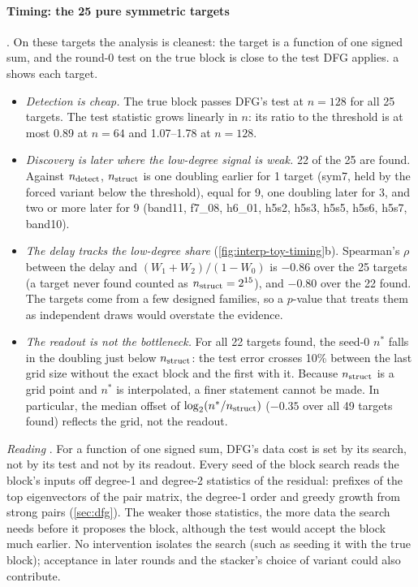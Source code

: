 \paragraph{Timing: the 25 pure symmetric targets} . On these targets the analysis is cleanest: the target is a function of one signed sum, and the round-0 test on the true block is close to the test DFG applies. a shows each target.
\begin{itemize}
\item \emph{Detection is cheap.} The true block passes DFG's test at $n=128$ for all 25 targets. The test statistic grows linearly in $n$: its ratio to the threshold is at most 0.89 at $n=64$ and 1.07--1.78 at $n=128$.
\item \emph{Discovery is later where the low-degree signal is weak.} 22 of the 25 are found. Against $n_{\rm detect}$, $n_{\rm struct}$ is one doubling earlier for 1 target (sym7, held by the forced variant below the threshold), equal for 9, one doubling later for 3, and two or more later for 9 (band11, f7\_08, h6\_01, h5s2, h5s3, h5s5, h5s6, h5s7, band10).
\item \emph{The delay tracks the low-degree share} (\cref{fig:interp-toy-timing}b). Spearman's $\rho$ between the delay and $(W_1+W_2)/(1-W_0)$ is $-0.86$ over the 25 targets (a target never found counted as $n_{\rm struct}=2^{15}$), and $-0.80$ over the 22 found. The targets come from a few designed families, so a $p$-value that treats them as independent draws would overstate the evidence.
\item \emph{The readout is not the bottleneck.} For all 22 targets found, the seed-0 $n^*$ falls in the doubling just below $n_{\rm struct}$: the test error crosses 10\% between the last grid size without the exact block and the first with it. Because $n_{\rm struct}$ is a grid point and $n^*$ is interpolated, a finer statement cannot be made. In particular, the median offset of $\log_2(n^*/n_{\rm struct})$ ($-0.35$ over all 49 targets found) reflects the grid, not the readout.
\end{itemize}
\emph{Reading} . For a function of one signed sum, DFG's data cost is set by its search, not by its test and not by its readout. Every seed of the block search reads the block's inputs off degree-1 and degree-2 statistics of the residual: prefixes of the top eigenvectors of the pair matrix, the degree-1 order and greedy growth from strong pairs (\cref{sec:dfg}). The weaker those statistics, the more data the search needs before it proposes the block, although the test would accept the block much earlier. No intervention isolates the search (such as seeding it with the true block); acceptance in later rounds and the stacker's choice of variant could also contribute.

